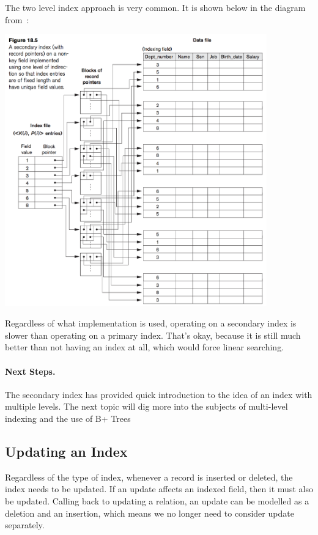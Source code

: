 The two level index approach is very common. It is shown below in the diagram from~\cite{fds}: 

\begin{center}
\includegraphics[width=0.85\textwidth]{images/secondary-index-2level}
\end{center}

Regardless of what implementation is used, operating on a secondary index is slower than operating on a primary index. That's okay, because it is still much better than not having an index at all, which would force linear searching. 

\paragraph{Next Steps.}
The secondary index has provided quick introduction to the idea of an index with multiple levels. The next topic will dig more into the subjects of multi-level indexing and the use of B+ Trees 

\subsection*{Updating an Index}

Regardless of the type of index, whenever a record is inserted or deleted, the index needs to be updated. If an update affects an indexed field, then it must also be updated. Calling back to updating a relation, an update can be modelled as a deletion and an insertion, which means we no longer need to consider update separately.

